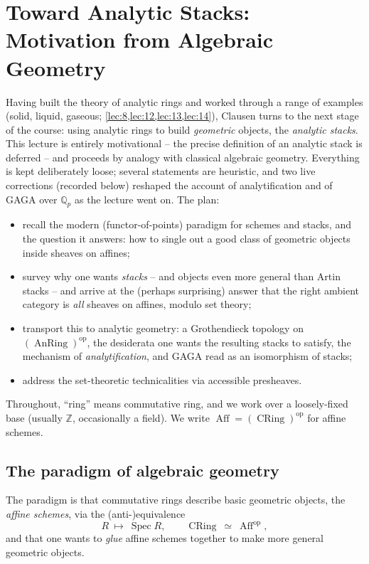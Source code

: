 \section{Toward Analytic Stacks: Motivation from Algebraic Geometry}
\label{lec:15}

Having built the theory of analytic rings and worked through a range of examples
(solid, liquid, gaseous; \cref{lec:8,lec:12,lec:13,lec:14}), Clausen turns to the
next stage of the course: using analytic rings to build \emph{geometric}
objects, the \emph{analytic stacks}. This lecture is entirely motivational -- the
precise definition of an analytic stack is deferred -- and proceeds by analogy
with classical algebraic geometry. Everything is kept deliberately loose; several
statements are heuristic, and two live corrections (recorded below) reshaped the
account of analytification and of GAGA over $\mathbb{Q}_p$ as the lecture went
on. The plan:
\begin{itemize}
\item recall the modern (functor-of-points) paradigm for schemes and stacks, and
the question it answers: how to single out a good class of geometric objects
inside sheaves on affines;
\item survey why one wants \emph{stacks} -- and objects even more general than
Artin stacks -- and arrive at the (perhaps surprising) answer that the right
ambient category is \emph{all} sheaves on affines, modulo set theory;
\item transport this to analytic geometry: a Grothendieck topology on
$(\operatorname{AnRing})^{\mathrm{op}}$, the desiderata one wants the resulting
stacks to satisfy, the mechanism of \emph{analytification}, and GAGA read as an
isomorphism of stacks;
\item address the set-theoretic technicalities via accessible presheaves.
\end{itemize}

Throughout, ``ring'' means commutative ring, and we work over a loosely-fixed base
(usually $\mathbb{Z}$, occasionally a field). We write $\operatorname{Aff} =
(\operatorname{CRing})^{\mathrm{op}}$ for affine schemes.

\subsection{The paradigm of algebraic geometry}

The paradigm is that commutative rings describe basic geometric objects, the
\emph{affine schemes}, via the (anti-)equivalence
\begin{equation*}
R\ \longmapsto\ \operatorname{Spec} R,\qquad \operatorname{CRing}\ \simeq\ \operatorname{Aff}^{\mathrm{op}},
\end{equation*}
and that one wants to \emph{glue} affine schemes together to make more general
geometric objects.

